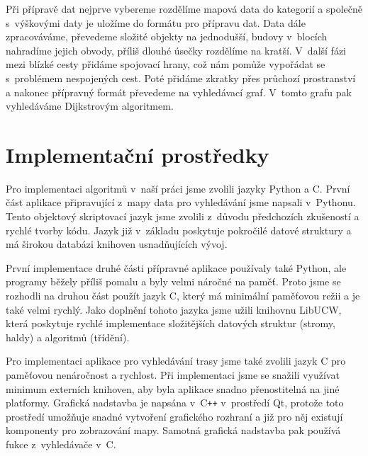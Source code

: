 Při přípravě dat nejprve vybereme rozdělíme mapová data do kategorií a společně
s~výškovými daty je uložíme do formátu pro přípravu dat. Data dále zpracováváme,
převedeme složité objekty na jednodušší, budovy v~blocích nahradíme jejich
obvody, příliš dlouhé úsečky rozdělíme na kratší. V~další fázi mezi blízké cesty
přidáme spojovací hrany, což nám pomůže vypořádat se s~problémem nespojených
cest. Poté přidáme zkratky přes průchozí prostranství a nakonec přípravný formát
převedeme na vyhledávací graf. V~tomto grafu pak vyhledáváme Dijkstrovým
algoritmem.

%

\section{Implementační prostředky}
Pro implementaci algoritmů v~naší práci jsme zvolili jazyky Python a C. První část
aplikace připravující z~mapy data pro vyhledávání jsme napsali v~Pythonu. Tento
objektový skriptovací jazyk jsme zvolili z~důvodu předchozích zkušeností a
rychlé tvorby kódu. Jazyk již v~základu poskytuje pokročilé datové struktury a
má širokou databázi knihoven usnadňujících vývoj. 

První implementace druhé části přípravné aplikace používaly také Python, ale programy
běžely příliš pomalu a byly velmi náročné na paměť. Proto jsme se rozhodli na
druhou část použít jazyk C, který má minimální paměťovou režii a je také velmi
rychlý. Jako doplnění tohoto jazyka jsme užili knihovnu LibUCW, která poskytuje
rychlé implementace složitějších datových struktur (stromy, haldy) a algoritmů
(třídění). 

Pro implementaci aplikace pro vyhledávání trasy jsme také zvolili jazyk C pro
paměťovou nenáročnost a rychlost. Při implementaci jsme se snažili využívat
minimum externích knihoven, aby byla aplikace snadno přenostitelná na jiné
platformy. Grafická nadstavba je napsána v~C{\tt++} v~prostředí Qt, protože toto
prostředí umožňuje snadné vytvoření grafického rozhraní a již pro něj existují
komponenty pro zobrazování mapy. Samotná grafická nadstavba pak používá fukce
z~vyhledávače v~C.


